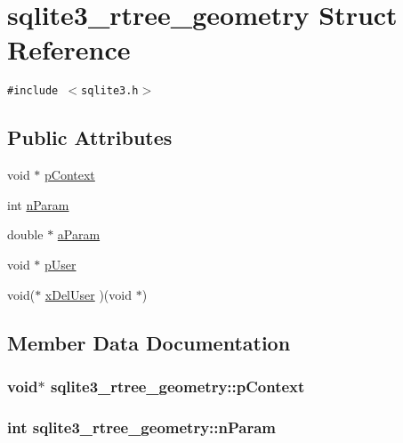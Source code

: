 \hypertarget{structsqlite3__rtree__geometry}{
\section{sqlite3\_\-rtree\_\-geometry Struct Reference}
\label{structsqlite3__rtree__geometry}
}
{\tt \#include $<$sqlite3.h$>$}

\subsection*{Public Attributes}
\begin{CompactItemize}
\item 
void $\ast$ \hyperlink{structsqlite3__rtree__geometry_62fe439a49ed5b8628464c418f35f572}{pContext}
\item 
int \hyperlink{structsqlite3__rtree__geometry_da7b9eba82660e3321dd4c93526697c9}{nParam}
\item 
double $\ast$ \hyperlink{structsqlite3__rtree__geometry_0c8490f1e003fd50729b87fa97bf0526}{aParam}
\item 
void $\ast$ \hyperlink{structsqlite3__rtree__geometry_dd62e1cd5faa6000c815104af3c540d0}{pUser}
\item 
void($\ast$ \hyperlink{structsqlite3__rtree__geometry_fa1ed10f488b306df354efe56efdf287}{xDelUser} )(void $\ast$)
\end{CompactItemize}


\subsection{Member Data Documentation}
\hypertarget{structsqlite3__rtree__geometry_62fe439a49ed5b8628464c418f35f572}{
\subsubsection[pContext]{\setlength{\rightskip}{0pt plus 5cm}void$\ast$ {\bf sqlite3\_\-rtree\_\-geometry::pContext}}}
\label{structsqlite3__rtree__geometry_62fe439a49ed5b8628464c418f35f572}


\hypertarget{structsqlite3__rtree__geometry_da7b9eba82660e3321dd4c93526697c9}{
\subsubsection[nParam]{\setlength{\rightskip}{0pt plus 5cm}int {\bf sqlite3\_\-rtree\_\-geometry::nParam}}}
\label{structsqlite3__rtree__geometry_da7b9eba82660e3321dd4c93526697c9}


